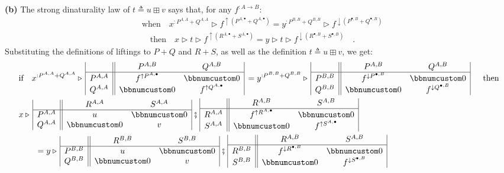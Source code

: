 \textbf{(b)} The strong dinaturality law of $t\triangleq u\boxplus v$
says that, for any $f^{:A\rightarrow B}$:
\begin{align*}
 & \text{when}\quad x^{:P^{A,A}+Q^{A,A}}\triangleright f^{\uparrow(P^{A,\bullet}+Q^{A,\bullet})}=y^{:P^{B,B}+Q^{B,B}}\triangleright f^{\downarrow(P^{\bullet,B}+Q^{\bullet,B})}\\
 & \quad\text{then}\quad x\triangleright t\triangleright f^{\uparrow(R^{A,\bullet}+S^{A,\bullet})}=y\triangleright t\triangleright f^{\downarrow(R^{\bullet,B}+S^{\bullet,B})}\quad.
\end{align*}
Substituting the definitions of liftings to $P+Q$ and $R+S$, as
well as the definition $t\triangleq u\boxplus v$, we get:
\begin{align*}
 & \text{if}\quad x^{:P^{A,A}+Q^{A,A}}\triangleright\,\begin{array}{|c||cc|}
 & P^{A,B} & Q^{A,B}\\
\hline P^{A,A} & f^{\uparrow P^{A,\bullet}} & \bbnum 0\\
Q^{A,A} & \bbnum 0 & f^{\uparrow Q^{A,\bullet}}
\end{array}\,=y^{:P^{B,B}+Q^{B,B}}\triangleright\,\begin{array}{|c||cc|}
 & P^{A,B} & Q^{A,B}\\
\hline P^{B,B} & f^{\downarrow P^{\bullet,B}} & \bbnum 0\\
Q^{B,B} & \bbnum 0 & f^{\downarrow Q^{\bullet,B}}
\end{array}\,\quad\text{ then}\\
 & x\triangleright\,\begin{array}{|c||cc|}
 & R^{A,A} & S^{A,A}\\
\hline P^{A,A} & u & \bbnum 0\\
Q^{A,A} & \bbnum 0 & v
\end{array}\,\bef\,\begin{array}{|c||cc|}
 & R^{A,B} & S^{A,B}\\
\hline R^{A,A} & f^{\uparrow R^{A,\bullet}} & \bbnum 0\\
S^{A,A} & \bbnum 0 & f^{\uparrow S^{A,\bullet}}
\end{array}\\
 & \quad\quad=y\triangleright\,\begin{array}{|c||cc|}
 & R^{B,B} & S^{B,B}\\
\hline P^{B,B} & u & \bbnum 0\\
Q^{B,B} & \bbnum 0 & v
\end{array}\,\bef\,\begin{array}{|c||cc|}
 & R^{A,B} & S^{A,B}\\
\hline R^{B,B} & f^{\downarrow R^{\bullet,B}} & \bbnum 0\\
S^{B,B} & \bbnum 0 & f^{\downarrow S^{\bullet,B}}
\end{array}
\end{align*}
